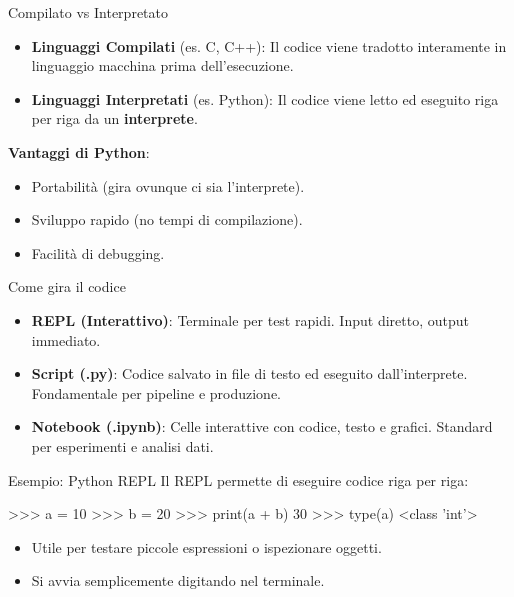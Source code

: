 \documentclass[12pt,aspectratio=169,notheorems]{beamer}
\begin{document}
\begin{frame}{Compilato vs Interpretato}
    \begin{itemize}
        \item \textbf{Linguaggi Compilati} (es. C, C++): Il codice viene tradotto interamente in linguaggio macchina prima dell'esecuzione.
        \item \textbf{Linguaggi Interpretati} (es. Python): Il codice viene letto ed eseguito riga per riga da un \textbf{interprete}.
    \end{itemize}
    \vfill
    \textbf{Vantaggi di Python}:
    \begin{itemize}
        \item Portabilità (gira ovunque ci sia l'interprete).
        \item Sviluppo rapido (no tempi di compilazione).
        \item Facilità di debugging.
    \end{itemize}
\end{frame}

\begin{frame}{Come gira il codice}
    \begin{itemize}
        \item \textbf{REPL (Interattivo)}: Terminale per test rapidi. Input diretto, output immediato.
        \item \textbf{Script (.py)}: Codice salvato in file di testo ed eseguito dall'interprete. Fondamentale per pipeline e produzione.
        \item \textbf{Notebook (.ipynb)}: Celle interattive con codice, testo e grafici. Standard per esperimenti e analisi dati.
    \end{itemize}
\end{frame}

\begin{frame}[fragile]{Esempio: Python REPL}
    Il REPL permette di eseguire codice riga per riga:
    \begin{python}[numbers=none]
        >>> a = 10
        >>> b = 20
        >>> print(a + b)
        30
        >>> type(a)
        <class 'int'>
    \end{python}
    \vfill
    \begin{itemize}
        \item Utile per testare piccole espressioni o ispezionare oggetti.
        \item Si avvia semplicemente digitando  nel terminale.
    \end{itemize}
\end{frame}
\end{document}

